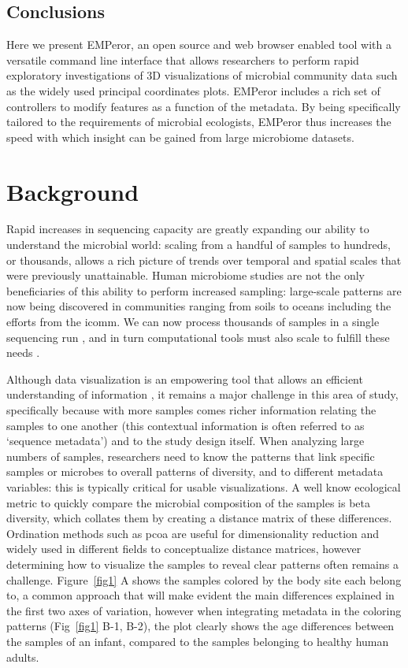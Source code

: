 \subsection{Conclusions}

Here we present EMPeror, an open source and web browser enabled tool with a versatile command line interface that allows researchers to perform rapid exploratory investigations of 3D visualizations of microbial community data such as the widely used principal coordinates plots. EMPeror includes a rich set of controllers to modify features as a function of the metadata. By being specifically tailored to the requirements of microbial ecologists, EMPeror thus increases the speed with which insight can be gained from large microbiome datasets.

\section{Background}

Rapid increases in sequencing capacity are greatly expanding our ability to understand the microbial world: scaling from a handful of samples to hundreds, or thousands, allows a rich picture of trends over temporal and spatial scales that were previously unattainable. Human microbiome studies are not the only beneficiaries of this ability to perform increased sampling: large-scale patterns are now being discovered in communities ranging from soils \cite{RN108} to oceans \cite{RN115} including the efforts from the \gls{icomm}.  We can now process thousands of samples in a single sequencing run \cite{RN85}, and in turn computational tools must also scale to fulfill these needs \cite{RN53}.

Although data visualization is an empowering tool that allows an efficient understanding of information \cite{RN126}, it remains a major challenge in this area of study, specifically because with more samples comes richer information relating the samples to one another (this contextual information is often referred to as `sequence metadata') and to the study design itself. When analyzing large numbers of samples, researchers need to know the patterns that link specific samples or microbes to overall patterns of diversity, and to different metadata variables: this is typically critical for usable visualizations. A well know ecological metric to quickly compare the microbial composition of the samples is beta diversity, which collates them by creating a distance matrix of these differences. Ordination methods such as \gls{pcoa} \cite{RN109} are useful for dimensionality reduction and widely used in different fields to conceptualize distance matrices, however determining how to visualize the samples to reveal clear patterns often remains a challenge. Figure~\ref{fig1} A shows the samples colored by the body site each belong to, a common approach that will make evident the main differences explained in the first two axes of variation, however when integrating metadata in the coloring patterns  (Fig~\ref{fig1} B-1, B-2), the plot clearly shows the age differences between the samples of an infant, compared to the samples belonging to healthy human adults.


